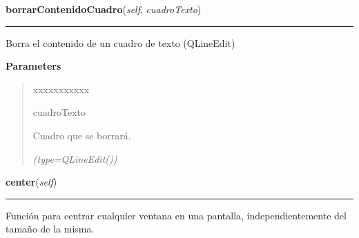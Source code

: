     \label{inicio:VentanaInicio:borrarContenidoCuadro}

    \vspace{0.5ex}

\hspace{.8\funcindent}\begin{boxedminipage}{\funcwidth}

    \raggedright \textbf{borrarContenidoCuadro}(\textit{self}, \textit{cuadroTexto})

    \vspace{-1.5ex}

    \rule{\textwidth}{0.5\fboxrule}
\setlength{\parskip}{2ex}
    Borra el contenido de un cuadro de texto (QLineEdit)

\setlength{\parskip}{1ex}
      \textbf{Parameters}
      \vspace{-1ex}

      \begin{quote}
        \begin{Ventry}{xxxxxxxxxxx}

          \item[cuadroTexto]

          Cuadro que se borrará.

            {\it (type=QLineEdit())}

        \end{Ventry}

      \end{quote}

    \end{boxedminipage}

    \label{inicio:VentanaInicio:center}

    \vspace{0.5ex}

\hspace{.8\funcindent}\begin{boxedminipage}{\funcwidth}

    \raggedright \textbf{center}(\textit{self})

    \vspace{-1.5ex}

    \rule{\textwidth}{0.5\fboxrule}
\setlength{\parskip}{2ex}
    Función para centrar cualquier ventana en una pantalla, 
    independientemente del tamaño de la misma.

\setlength{\parskip}{1ex}
    \end{boxedminipage}

